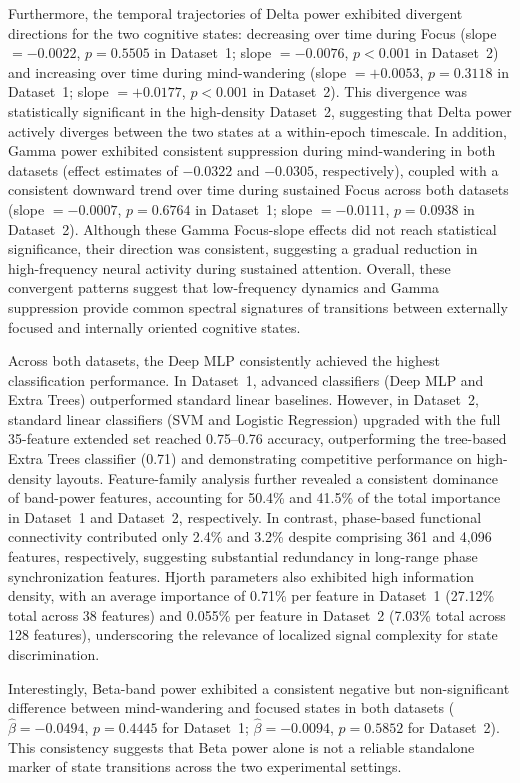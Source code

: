 \documentclass[conference]{IEEEtran}
\begin{document}
Furthermore, the temporal trajectories of Delta power exhibited divergent directions for the two cognitive states: decreasing over time during Focus (slope $= -0.0022$, $p=0.5505$ in Dataset~1; slope $= -0.0076$, $p < 0.001$ in Dataset~2) and increasing over time during mind-wandering (slope $= +0.0053$, $p=0.3118$ in Dataset~1; slope $= +0.0177$, $p < 0.001$ in Dataset~2). This divergence was statistically significant in the high-density Dataset~2, suggesting that Delta power actively diverges between the two states at a within-epoch timescale. In addition, Gamma power exhibited consistent suppression during mind-wandering in both datasets (effect estimates of $-0.0322$ and $-0.0305$, respectively), coupled with a consistent downward trend over time during sustained Focus across both datasets (slope $= -0.0007$, $p=0.6764$ in Dataset~1; slope $= -0.0111$, $p=0.0938$ in Dataset~2). Although these Gamma Focus-slope effects did not reach statistical significance, their direction was consistent, suggesting a gradual reduction in high-frequency neural activity during sustained attention. Overall, these convergent patterns suggest that low-frequency dynamics and Gamma suppression provide common spectral signatures of transitions between externally focused and internally oriented cognitive states.

Across both datasets, the Deep MLP consistently achieved the highest classification performance. In Dataset~1, advanced classifiers (Deep MLP and Extra Trees) outperformed standard linear baselines. However, in Dataset~2, standard linear classifiers (SVM and Logistic Regression) upgraded with the full 35-feature extended set reached 0.75--0.76 accuracy, outperforming the tree-based Extra Trees classifier (0.71) and demonstrating competitive performance on high-density layouts. Feature-family analysis further revealed a consistent dominance of band-power features, accounting for 50.4\% and 41.5\% of the total importance in Dataset~1 and Dataset~2, respectively. In contrast, phase-based functional connectivity contributed only 2.4\% and 3.2\% despite comprising 361 and 4,096 features, respectively, suggesting substantial redundancy in long-range phase synchronization features. Hjorth parameters also exhibited high information density, with an average importance of 0.71\% per feature in Dataset~1 (27.12\% total across 38 features) and 0.055\% per feature in Dataset~2 (7.03\% total across 128 features), underscoring the relevance of localized signal complexity for state discrimination.

Interestingly, Beta-band power exhibited a consistent negative but non-significant difference between mind-wandering and focused states in both datasets ($\hat{\beta}=-0.0494$, $p=0.4445$ for Dataset~1; $\hat{\beta}=-0.0094$, $p=0.5852$ for Dataset~2). This consistency suggests that Beta power alone is not a reliable standalone marker of state transitions across the two experimental settings.
\end{document}
